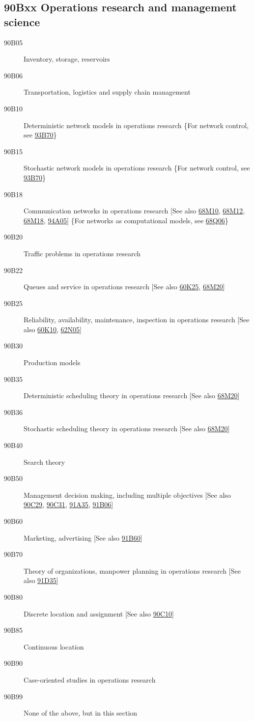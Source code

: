 \subsection*{90Bxx  Operations research and management science }\label{90Bxx}
\begin{description}  
\item [90B05]\label{90B05} Inventory, storage, reservoirs
\item [90B06]\label{90B06} Transportation, logistics and supply chain management 
\item [90B10]\label{90B10} Deterministic network models in operations research \{For network control, see \hyperref[93B70]{93B70}\}
\item [90B15]\label{90B15} Stochastic network models in operations research \{For network control, see \hyperref[93B70]{93B70}\}
\item [90B18]\label{90B18} Communication networks in operations research [See also \hyperref[68M10]{68M10}, \hyperref[68M12]{68M12}, \hyperref[68M18]{68M18}, \hyperref[94A05]{94A05}] \{For networks as computational models, see \hyperref[68Q06]{68Q06}\}
\item [90B20]\label{90B20} Traffic problems in operations research
\item [90B22]\label{90B22} Queues and service in operations research [See also \hyperref[60K25]{60K25}, \hyperref[68M20]{68M20}]
\item [90B25]\label{90B25} Reliability, availability, maintenance, inspection in operations research [See also \hyperref[60K10]{60K10}, \hyperref[62N05]{62N05}]
\item [90B30]\label{90B30} Production models
\item [90B35]\label{90B35} Deterministic scheduling theory in operations research [See also \hyperref[68M20]{68M20}]
\item [90B36]\label{90B36} Stochastic scheduling theory in operations research [See also \hyperref[68M20]{68M20}]
\item [90B40]\label{90B40} Search theory
\item [90B50]\label{90B50} Management decision making, including multiple objectives [See also \hyperref[90C29]{90C29}, \hyperref[90C31]{90C31}, \hyperref[91A35]{91A35}, \hyperref[91B06]{91B06}]
\item [90B60]\label{90B60} Marketing, advertising [See also \hyperref[91B60]{91B60}]
\item [90B70]\label{90B70} Theory of organizations, manpower planning in operations research [See also \hyperref[91D35]{91D35}]
\item [90B80]\label{90B80} Discrete location and assignment [See also \hyperref[90C10]{90C10}]
\item [90B85]\label{90B85} Continuous location
\item [90B90]\label{90B90} Case-oriented studies in operations research
\item [90B99]\label{90B99} None of the above, but in this section
\end{description}
